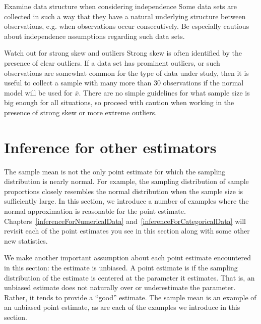 \begin{caution}
{Examine data structure when considering independence}
{Some data sets are collected in such a way that they have a natural underlying structure between observations, e.g. when observations occur consecutively. Be especially cautious about independence assumptions regarding such data sets.}
\end{caution}

\begin{caution}
{Watch out for strong skew and outliers}
{Strong skew is often identified by the presence of clear outliers. If a data set has prominent outliers, or such observations are somewhat common for the type of data under study, then it is useful to collect a sample with many more than 30 observations if the normal model will be used for $\bar{x}$. There are no simple guidelines for what sample size is big enough for all situations, so proceed with caution when working in the presence of strong skew or more extreme outliers.}
\end{caution}


\section{Inference for other estimators}
\label{aFrameworkForInference}

The sample mean is not the only point estimate for which the sampling distribution is nearly normal. For example, the sampling distribution of sample proportions closely resembles the normal distribution when the sample size is sufficiently large. In this section, we introduce a number of examples where the normal approximation is reasonable for the point estimate. Chapters~\ref{inferenceForNumericalData} and~\ref{inferenceForCategoricalData} will revisit each of the point estimates you see in this section along with some other new statistics.

We make another important assumption about each point estimate encountered in this section: the estimate is unbiased. A point estimate is  if the sampling distribution of the estimate is centered at the parameter it estimates. That is, an unbiased estimate does not naturally over or underestimate the parameter. Rather, it tends to provide a ``good'' estimate. The sample mean is an example of an unbiased point estimate, as are each of the examples we introduce in this section.

